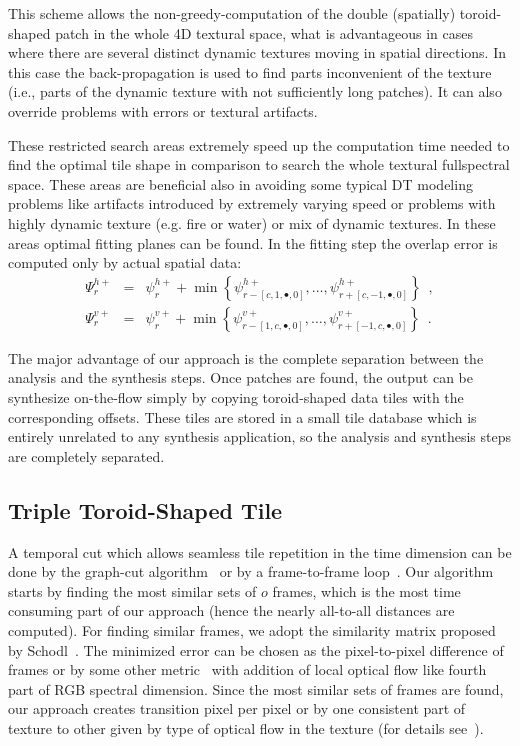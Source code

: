 \documentclass{\adsty/acmsiggraph}
\begin{document}
This scheme allows the non-greedy-computation of the double (spatially) toroid-shaped patch in the whole 4D textural space, what  is advantageous in cases where there are several distinct   dynamic textures  moving in spatial directions. %
In this case the back-propagation is used to find  parts inconvenient of the texture (i.e., parts of the dynamic texture 	 with not sufficiently long patches).  It can also override problems with errors or textural artifacts.
				
These restricted search  areas extremely speed up the computation time needed to find
 the optimal tile shape in comparison to search the whole textural fullspectral space.
 These areas are beneficial also in avoiding some typical DT modeling problems
 like artifacts introduced by extremely varying speed   or problems with highly dynamic
texture (e.g. fire or water) or mix of dynamic textures. In these areas optimal fitting planes can be found.
In the fitting step the overlap error is computed only by actual spatial data:		
\begin{eqnarray} 						
\Psi_{r}^{h+} & = & \psi_{r}^{h+}  + {\min\left\{\psi_{r-[c,1,\bullet,0]}^{h+},\ldots,
                   \psi_{r+[c,-1,\bullet,0]}^{h+}\right \} }\enspace , \nonumber \\
\Psi_{r}^{v+} & = & \psi_{r}^{v+}  + {\min\left\{\psi_{r-[1,c,\bullet,0]}^{v+},\ldots,
		 \psi_{r+[-1,c,\bullet,0]}^{v+} \right\} } \enspace . \nonumber
\end{eqnarray}
			
The major advantage of our approach is the complete separation between  the analysis and the synthesis steps.
Once patches are found, the output can be synthesize on-the-flow simply by copying toroid-shaped data tiles 
with the corresponding offsets.
These tiles are stored in a small tile database which is entirely unrelated to any synthesis application,  so the analysis and synthesis steps are completely separated.
			
\subsection{Triple Toroid-Shaped Tile}
	
A  temporal cut which allows seamless  tile repetition in the time dimension can be done by the graph-cut algorithm~\cite{Kwatra03graphcuttextures} or by a frame-to-frame loop~\cite{Schodl00videotextures}.
Our algorithm starts by finding the most similar sets of $o$ frames, which is the most time consuming part of our approach (hence the nearly all-to-all distances are computed). 
For finding similar frames, we adopt the similarity matrix proposed by Schodl~\cite{Schodl00videotextures}. 
The minimized error can be chosen as the pixel-to-pixel difference of frames or by some other metric~\cite{Kwatra05textureoptimization} with addition of local optical flow like fourth part of RGB spectral dimension.
Since the most similar sets of frames are found, our approach creates transition pixel per pixel or by one consistent part of texture to other  given by type of optical flow in the texture (for details see~\cite{Richtr13}).
\end{document}
